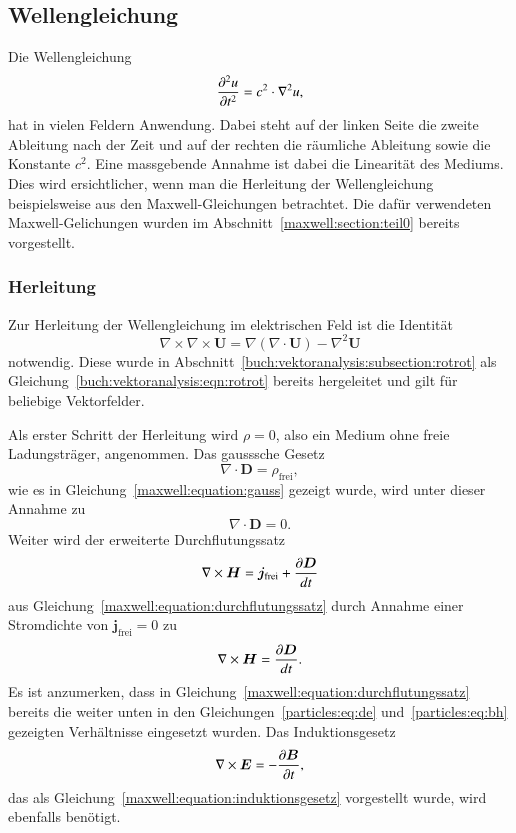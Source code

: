 \subsection{Wellengleichung}\label{particles:section:lin-medium:wellengleichung}
Die Wellengleichung 
\begin{equation}
    \frac{\d^2 u}{\d t^2} = c^2 \cdot \nabla^2 u, \label{particles:eq:wellengleichung}
\end{equation}
hat in vielen Feldern Anwendung.
Dabei steht auf der linken Seite die zweite Ableitung nach der Zeit und auf der rechten die räumliche Ableitung sowie die Konstante $c^2$.
Eine massgebende Annahme ist dabei die Linearität des Mediums.
Dies wird ersichtlicher, wenn man die Herleitung der Wellengleichung beispielsweise aus den Maxwell-Gleichungen betrachtet.
Die dafür verwendeten Maxwell-Gelichungen wurden im Abschnitt~\ref{maxwell:section:teil0} bereits vorgestellt.


\subsubsection{Herleitung}
Zur Herleitung der Wellengleichung im elektrischen Feld ist die Identität
\begin{equation}
    \nabla \times \nabla \times \boldsymbol{U} = \nabla(\nabla \cdot \boldsymbol{U}) - \nabla^2 \boldsymbol{U}\label{particles:eq:rot-identity}
\end{equation}
notwendig. 
Diese wurde in Abschnitt~\ref{buch:vektoranalysis:subsection:rotrot} als Gleichung~\eqref{buch:vektoranalysis:eqn:rotrot} bereits hergeleitet und gilt für beliebige Vektorfelder.

Als erster Schritt der Herleitung wird $\rho = 0$, also ein Medium ohne freie Ladungsträger, angenommen.
Das gausssche Gesetz
\[
    \nabla \cdot \boldsymbol{D} = \rho_\text{frei},
\]
wie es in Gleichung~\eqref{maxwell:equation:gauss} gezeigt wurde, wird unter dieser Annahme zu
\begin{equation}
    \nabla \cdot \boldsymbol{D} = 0.\label{particles:eq:gauss}
\end{equation}
Weiter wird der erweiterte Durchflutungssatz
\[
    \nabla \times \boldsymbol{H} = \boldsymbol{j}_\text{frei} + \frac{\d \boldsymbol{D}}{dt}
\]
aus Gleichung~\eqref{maxwell:equation:durchflutungssatz} durch Annahme einer Stromdichte von $\boldsymbol{j}_\text{frei} = 0$ zu
\begin{equation}
    \nabla \times \boldsymbol{H} = \frac{\d \boldsymbol{D}}{dt}.\label{particles:eq:durchflutungssatz}
\end{equation}
Es ist anzumerken, dass in Gleichung~\eqref{maxwell:equation:durchflutungssatz} bereits die weiter unten in den Gleichungen~\eqref{particles:eq:de} und~\eqref{particles:eq:bh} gezeigten Verhältnisse eingesetzt wurden.
Das Induktionsgesetz
\begin{equation}
    \nabla \times \boldsymbol{E} = -\frac{\d \boldsymbol{B}}{\d t}\label{particles:eq:induktionsgesetz},
\end{equation}
das als Gleichung~\eqref{maxwell:equation:induktionsgesetz} vorgestellt wurde, wird ebenfalls benötigt.

